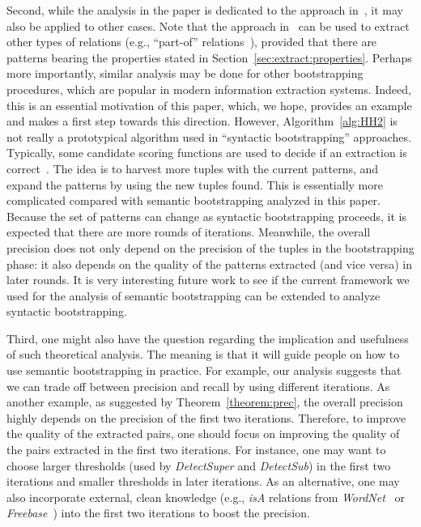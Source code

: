 \documentclass[10pt,journal,cspaper,compsoc]{IEEEtran}
\begin{document}
Second, while the analysis in the paper is dedicated to the approach in~\cite{WuLWZ12:Probase}, it may also be applied to other cases.
Note that the approach in~\cite{WuLWZ12:Probase} can be used to extract other types of relations (e.g., ``part-of'' relations~\cite{PonzettoS07}), provided that there are patterns bearing the properties stated in Section~\ref{sec:extract:properties}.
Perhaps more importantly, similar analysis may be done for other bootstrapping procedures, which are popular in modern information extraction systems.
Indeed, this is an essential motivation of this paper, which, we hope, provides an example and makes a first step towards this direction.
However, Algorithm~\ref{alg:HH2} is not really a prototypical algorithm used in ``syntactic bootstrapping'' approaches. Typically, some candidate scoring functions are used to decide if an extraction is correct~\cite{BlohmCS07}.
The idea is to harvest more tuples with the current patterns, and expand the patterns by using the new tuples found.
This is essentially more complicated compared with semantic bootstrapping analyzed in this paper.
Because the set of patterns can change as syntactic bootstrapping proceeds, it is expected that there are more rounds of iterations.
Meanwhile, the overall precision does not only depend on the precision of the tuples in the bootstrapping phase: it also depends on the quality of the patterns extracted (and vice versa) in later rounds.
It is very interesting future work to see if the current framework we used for the analysis of semantic bootstrapping can be extended to analyze syntactic bootstrapping.

Third, one might also have the question regarding the implication and usefulness of such theoretical analysis. 
The meaning is that it will guide people on how to use semantic bootstrapping in practice. 
For example, our analysis suggests that we can trade off between precision and recall by using different iterations. 
As another example, as suggested by Theorem~\ref{theorem:prec}, the overall precision highly depends on the precision of the first two iterations.
Therefore, to improve the quality of the extracted pairs, one should focus on improving the quality of the pairs extracted in the first two iterations.
For instance, one may want to choose larger thresholds (used by \emph{DetectSuper} and \emph{DetectSub}) in the first two iterations and smaller thresholds in later iterations. As an alternative, one may also incorporate external, clean knowledge (e.g., \emph{isA} relations from \emph{WordNet}~\cite{wordnet} or \emph{Freebase}~\cite{freebase}) into the first two iterations to boost the precision.
\end{document}

